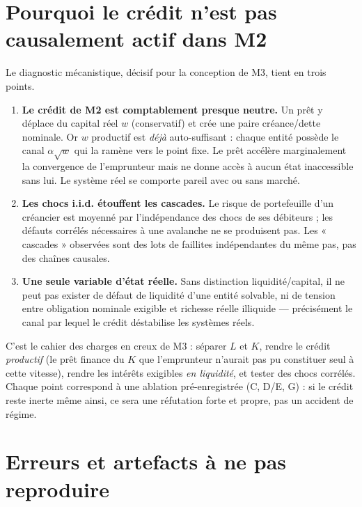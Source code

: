 \documentclass[11pt,a4paper]{article}
\begin{document}
\section{Pourquoi le crédit n'est pas causalement actif dans M2}
\label{sec:credit}

Le diagnostic mécanistique, décisif pour la conception de M3, tient en trois
points.

\begin{enumerate}[leftmargin=1.6em, itemsep=3pt]
\item \textbf{Le crédit de M2 est comptablement presque neutre.} Un prêt y
  déplace du capital réel $w$ (conservatif) et crée une paire créance/dette
  nominale. Or $w$ productif est \emph{déjà} auto-suffisant : chaque entité
  possède le canal $\alpha\sqrt{w}$ qui la ramène vers le point fixe. Le prêt
  accélère marginalement la convergence de l'emprunteur mais ne donne accès à
  aucun état inaccessible sans lui. Le système réel se comporte pareil avec ou
  sans marché.
\item \textbf{Les chocs i.i.d. étouffent les cascades.} Le risque de
  portefeuille d'un créancier est moyenné par l'indépendance des chocs de ses
  débiteurs ; les défauts corrélés nécessaires à une avalanche ne se produisent
  pas. Les « cascades » observées sont des lots de faillites indépendantes du
  même pas, pas des chaînes causales.
\item \textbf{Une seule variable d'état réelle.} Sans distinction
  liquidité/capital, il ne peut pas exister de défaut de liquidité d'une entité
  solvable, ni de tension entre obligation nominale exigible et richesse réelle
  illiquide --- précisément le canal par lequel le crédit déstabilise les
  systèmes réels.
\end{enumerate}

C'est le cahier des charges en creux de M3 : séparer $L$ et $K$, rendre le
crédit \emph{productif} (le prêt finance du $K$ que l'emprunteur n'aurait pas
pu constituer seul à cette vitesse), rendre les intérêts exigibles \emph{en
liquidité}, et tester des chocs corrélés. Chaque point correspond à une
ablation pré-enregistrée (C, D/E, G) : si le crédit reste inerte même ainsi,
ce sera une réfutation forte et propre, pas un accident de régime.

\section{Erreurs et artefacts à ne pas reproduire}
\label{sec:artefacts}
\end{document}
